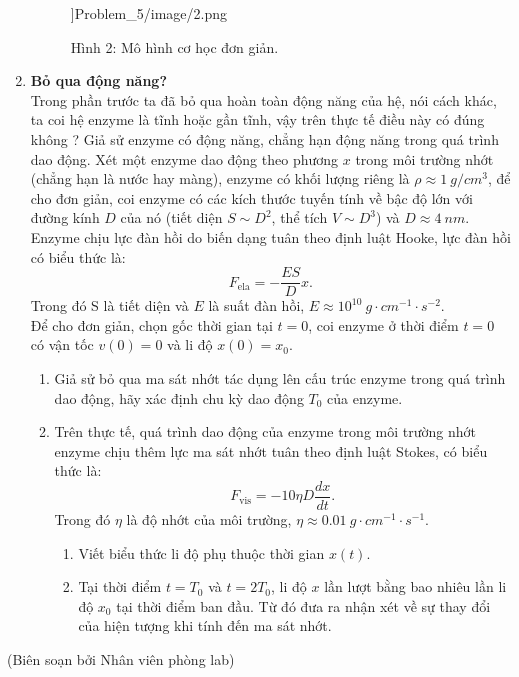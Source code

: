 \begin{enumerate}
\begin{center}
\begin{figure}[htp]
\begin{center}
        ]{Problem_5/image/2.png}
    \end{center}
    \begin{center}
    Hình 2: Mô hình cơ học đơn giản.
    \end{center}
    \end{figure}
\end{center}
\item \textbf{Bỏ qua động năng?}\\
    Trong phần trước ta đã bỏ qua hoàn toàn động năng của hệ, nói cách khác, ta coi hệ enzyme là tĩnh hoặc gần tĩnh, vậy trên thực tế điều này có đúng không ? Giả sử enzyme có động năng, chẳng hạn động năng trong quá trình dao động. Xét một enzyme dao động theo phương $x$ trong môi trường nhớt (chẳng hạn là nước hay màng), enzyme có khối lượng riêng là $\rho \approx 1 \ \si{g/cm^3}$, để cho đơn giản, coi enzyme có các kích thước tuyến tính về bậc độ lớn với đường kính $D$ của nó (tiết diện $S \sim D^2$, thể tích $V \sim D^3$) và $D \approx 4 \ \si{nm}$. Enzyme chịu lực đàn hồi do biến dạng tuân theo định luật Hooke, lực đàn hồi có biểu thức là:
    $$F_{\text{ela}}=-\dfrac{ES}{D}x.$$
    Trong đó S là tiết diện và $E$ là suất đàn hồi, $E \approx 10^{10} \ \si{g \cdot cm^{-1} \cdot s^{-2}}$.\\
    Để cho đơn giản, chọn gốc thời gian tại $t=0$, coi enzyme ở thời điểm $t=0$ có vận tốc $v(0)=0$ và li độ $x(0)=x_0$.
    \begin{enumerate}[label=\textbf{\alph*,}]\itemsep0em
        \item Giả sử bỏ qua ma sát nhớt tác dụng lên cấu trúc enzyme trong quá trình dao động, hãy xác định chu kỳ dao động $T_0$ của enzyme.
        \item Trên thực tế, quá trình dao động của enzyme trong môi trường nhớt enzyme chịu thêm lực ma sát nhớt tuân theo định luật Stokes, có biểu thức là:
        $$F_{\text{vis}}= -10 \eta D \dfrac{dx}{dt}.$$
    Trong đó $\eta$ là độ nhớt của môi trường, $\eta \approx 0.01 \ \si{g\cdot cm^{-1}\cdot s^{-1}}$.\\
    \begin{enumerate}
        \item Viết biểu thức li độ phụ thuộc thời gian $x(t)$.
        \item Tại thời điểm $t=T_0$ và $t=2T_0$, li độ $x$ lần lượt bằng bao nhiêu lần li độ $x_0$ tại thời điểm ban đầu. Từ đó đưa ra nhận xét về sự thay đổi của hiện tượng khi tính đến ma sát nhớt.
    \end{enumerate}
    \end{enumerate}
\end{enumerate}

\begin{flushright}
    (Biên soạn bởi Nhân viên phòng lab)
\end{flushright}